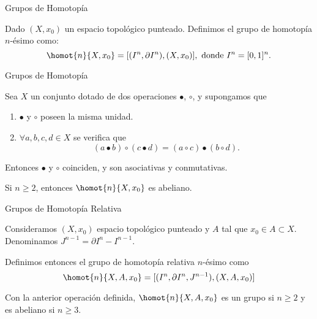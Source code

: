 \begin{frame}{Grupos de Homotopía}
\begin{defin}
Dado $(X, x_0)$ un espacio topológico punteado. Definimos el \alert{grupo de homotopía $n$-ésimo} como:
\[ \homot{n}{X, x_0} = [(I^n, \partial I^n), (X, x_0)], \text{ donde } I^n = [0,1]^n. \]
\end{defin}


\end{frame}

\begin{frame}{Grupos de Homotopía}
\begin{prop}
Sea $X$ un conjunto dotado de dos operaciones $\bullet$, $\circ$, y supongamos que 
\begin{enumerate}
\item $\bullet$ y $\circ$ poseen la misma unidad.
\item $\forall a,b,c,d \in X$ se verifica que
\[
(a \bullet b) \circ (c \bullet d) = (a \circ c) \bullet (b \circ d) .
\]
\end{enumerate}
Entonces $\bullet$ y $\circ$ coinciden, y son asociativas y conmutativas.
\end{prop}
\pause
\begin{teor}
Si $n \geq 2$, entonces $\homot{n}{X, x_0}$ es abeliano.
\end{teor}
\end{frame}

\begin{frame}{Grupos de Homotopía Relativa}
\begin{defin}
Consideramos $(X, x_0)$ espacio topológico punteado y $A$ tal que  $x_0 \in A \subset X$. Denominamos $J^{n-1} = \partial I^n - I^{n-1}$. \par 
Definimos entonces el \alert{grupo de homotopía relativa $n$-ésimo} como
\[
\homot{n}{X, A, x_0} = [(I^n, \partial I^n, J^{n-1}), (X, A, x_0)]
\]
\end{defin}
Con la anterior operación definida, $\homot{n}{X, A, x_0}$ es un grupo si $n \geq 2$ y es abeliano si $n \geq 3$.
\end{frame}

